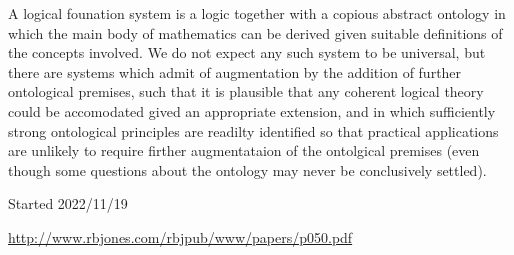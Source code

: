 \documentclass[10pt,titlepage]{article}
\begin{document}
A logical founation system is a logic together with a copious abstract ontology in which the main body of mathematics can be derived given suitable definitions of the concepts involved.
We do not expect any such system to be universal, but there are systems which admit of augmentation by the addition of further ontological premises, such that it is plausible that any coherent logical theory could be accomodated gived an appropriate extension, and in which sufficiently strong ontological principles are readilty identified so that practical applications are unlikely to require firther augmentataion of the ontolgical premises (even though some questions about the ontology may never be conclusively settled).



{}



\label{index}
{\twocolumn[]
  {\small\printindex}}


\tiny{
Started 2022/11/19

\href{http://www.rbjones.com/rbjpub/www/papers/p049.pdf}{http://www.rbjones.com/rbjpub/www/papers/p050.pdf}

}%
\end{document}
